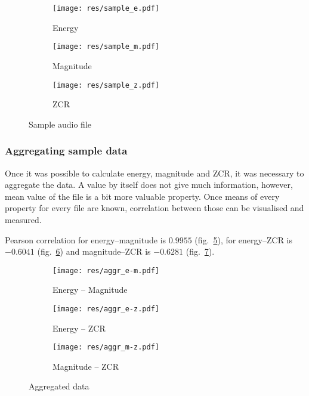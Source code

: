 \documentclass[english,11pt]{article}
\begin{document}
\begin{figure}
    \centering
    \begin{subfigure}[b]{0.6\textwidth}
        \texttt{[image: res/sample\_e.pdf]}
        \caption{Energy}
        \label{fig:sample_e}
    \end{subfigure}

    \begin{subfigure}[b]{0.6\textwidth}
        \texttt{[image: res/sample\_m.pdf]}
        \caption{Magnitude}
        \label{fig:sample_m}
    \end{subfigure}

    \begin{subfigure}[b]{0.6\textwidth}
        \texttt{[image: res/sample\_z.pdf]}
        \caption{ZCR}
        \label{fig:sample_z}
    \end{subfigure}
    \caption{Sample audio file}\label{fig:sample}
\end{figure}

\subsubsection{Aggregating sample data}

Once it was possible to calculate energy, magnitude and ZCR, it was necessary
to aggregate the data. A value by itself does not give much information,
however, mean value of the file is a bit more valuable property. Once means of
every property for every file are known, correlation between those can be
visualised and measured.

Pearson correlation for energy--magnitude is $0.9955$
(fig.~\ref{fig:aggr_e-m}), for energy--ZCR is $-0.6041$
(fig.~\ref{fig:aggr_e-z}) and magnitude--ZCR is $-0.6281$
(fig.~\ref{fig:aggr_m-z}).

\begin{figure}
    \centering
    \begin{subfigure}[b]{0.6\textwidth}
        \texttt{[image: res/aggr\_e-m.pdf]}
        \caption{Energy -- Magnitude}
        \label{fig:aggr_e-m}
    \end{subfigure}

    \begin{subfigure}[b]{0.6\textwidth}
        \texttt{[image: res/aggr\_e-z.pdf]}
        \caption{Energy -- ZCR}
        \label{fig:aggr_e-z}
    \end{subfigure}

    \begin{subfigure}[b]{0.6\textwidth}
        \texttt{[image: res/aggr\_m-z.pdf]}
        \caption{Magnitude -- ZCR}
        \label{fig:aggr_m-z}
    \end{subfigure}
    \caption{Aggregated data}\label{fig:aggr}
\end{figure}
\end{document}
